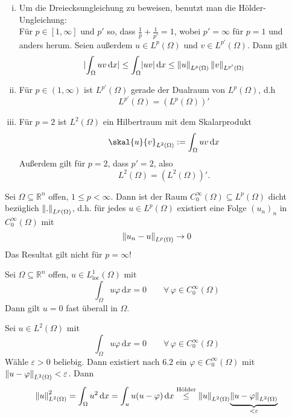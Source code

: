 \begin{bemerkung}
	\begin{enumerate}[(i)]
		\item Um die Dreiecksungleichung zu beweisen, benutzt man die Hölder- \\Ungleichung:\\
		Für $p \in [1,\infty]$ und $p'$ so, dass $\frac{1}{p}+ \frac{1}{p'} =1$, wobei $p'=\infty$ für $p=1$ und anders herum. Seien außerdem $u \in L^p(\Omega)$ und 
		$v \in L^{p'}(\Omega)$. Dann gilt
		\[
			\abs{\int_{\Omega}^{}uv \,\mathrm{d}x} \leq \int_{\Omega}^{}\abs{uv} \,\mathrm{d}x \leq \norm{u}_{L^p(\Omega)} \, \norm{v}_{L^{p'}(\Omega)}
		\]
		\item Für $p \in (1, \infty)$ ist $L^{p'}(\Omega)$ gerade der Dualraum von $L^p(\Omega)$, d.h
		\[
			L^{p'}(\Omega) = (L^p(\Omega))'
		\]
		\item Für $p=2$ ist $L^2(\Omega)$ ein Hilbertraum mit dem Skalarprodukt
		\[
			\skal{u}{v}_{L^2(\Omega)} := \int_{\Omega}^{}uv \,\mathrm{d}x
		\]
		Außerdem gilt für $p=2$, dass $p' = 2$, also
		\[
			L^2(\Omega) = (L^2(\Omega))'.
		\]
	\end{enumerate}
\end{bemerkung}
\begin{satz}
	Sei $\Omega \subseteq \mathbb{R}^n$ offen, $1 \leq p < \infty$. Dann ist der Raum $C^{\infty}_0(\Omega) \subseteq L^p(\Omega)$ dicht bezüglich $\norm{.}_{L^p(\Omega)}$, d.h. für jedes $u \in L^p(\Omega)$ existiert eine Folge $(u_n)_n$ in $C^{\infty}_0(\Omega)$ mit
	\[
		\norm{u_n-u}_{L^p(\Omega)} \to 0
	\]
	Das Resultat gilt nicht für $p=\infty$!
\end{satz}

\begin{satz}
	Sei $\Omega \subseteq \mathbb{R}^n$ offen, $u \in L^1_{\text{loc}}(\Omega)$ mit 
	\[
		\int_{\Omega}^{} u \varphi \,\mathrm{d}x = 0 \qquad \forall\, \varphi \in C^{\infty}_0(\Omega)
	\]
	Dann gilt $u=0$ fast überall in $\Omega$.
\end{satz}
\begin{beweis}
	Sei $u \in L^2(\Omega)$ mit
	\[
		\int_{\Omega}^{} u \varphi \,\mathrm{d}x = 0 \qquad \forall\, \varphi \in C^{\infty}_0(\Omega)
	\]
	Wähle $\varepsilon >0$ beliebig. Dann existiert nach $6.2$ ein $\varphi \in C^{\infty}_0(\Omega)$ mit $\norm{u-\varphi}_{L^2(\Omega)} < \varepsilon$. Dann 
	\[
		\norm{u}^2_{L^2(\Omega)} = \int_{\Omega}^{} u^2 \,\mathrm{d}x = \int_{u}^{}u (u-\varphi) \,\mathrm{d}x \stackrel{\text{Hölder}}{\leq } \norm{u}_{L^2(\Omega)} \underset{< \varepsilon}{\underbrace{\norm{u-\varphi}_{L^2(\Omega)}}}
	\]
\end{beweis}

